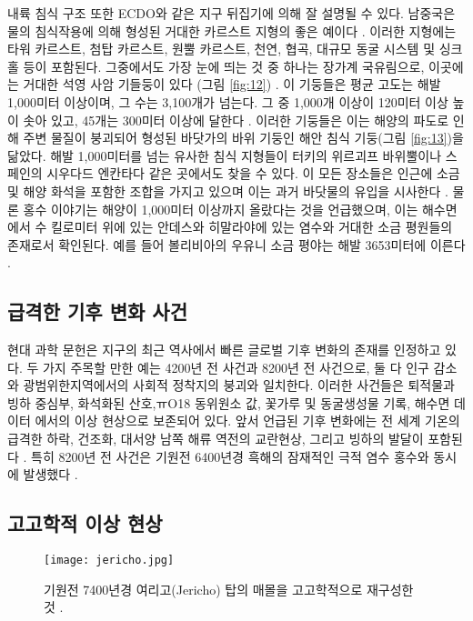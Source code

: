 \documentclass[10pt,twocolumn,letterpaper]{article}
\begin{document}
내륙 침식 구조 또한 ECDO와 같은 지구 뒤집기에 의해 잘 설명될 수 있다. 남중국은 물의 침식작용에 의해 형성된 거대한 카르스트 지형의 좋은 예이다 \cite{82}. 이러한 지형에는 타워 카르스트, 첨탑 카르스트, 원뿔 카르스트, 천연, 협곡, 대규모 동굴 시스템 및 싱크홀 등이 포함된다. 그중에서도 가장 눈에 띄는 것 중 하나는 장가계 국유림으로, 이곳에는 거대한 석영 사암 기들둥이 있다 (그림 \ref{fig:12}) \cite{84}. 이 기둥들은 평균 고도는 해발 1,000미터 이상이며, 그 수는 3,100개가 넘는다. 그 중 1,000개 이상이 120미터 이상 높이 솟아 있고, 45개는 300미터 이상에 달한다 \cite{85}. 이러한 기둥들은 이는 해양의 파도로 인해 주변 물질이 붕괴되어 형성된 바닷가의 바위 기둥인 해안 침식 기둥(그림 \ref{fig:13})을 닮았다. 해발 1,000미터를 넘는 유사한 침식 지형들이 터키의 위르괴프 바위뿔이나 스페인의 시우다드 엔칸타다 같은 곳에서도 찾을 수 있다. 이 모든 장소들은 인근에 소금 및 해양 화석을 포함한 조합을 가지고 있으며 이는 과거 바닷물의 유입을 시사한다 \cite{15,86,87}. 물론 홍수 이야기는 \cite{3} 해양이 1,000미터 이상까지 올랐다는 것을 언급했으며, 이는 해수면에서 수 킬로미터 위에 있는 안데스와 히말라야에 있는 염수와 거대한 소금 평원들의 존재로서 확인된다. 예를 들어 볼리비아의 우유니 소금 평야는 해발 3653미터에 이른다 \cite{94}.

\subsection{급격한 기후 변화 사건}

현대 과학 문헌은 지구의 최근 역사에서 빠른 글로벌 기후 변화의 존재를 인정하고 있다. 두 가지 주목할 만한 예는 4200년 전 사건과 8200년 전 사건으로, 둘 다 인구 감소와 광범위한지역에서의 사회적 정착지의 붕괴와 일치한다. 이러한 사건들은 퇴적물과 빙하 중심부, 화석화된 산호,ㅠO18 동위원소 값, 꽃가루 및 동굴생성물 기록, 해수면 데이터 에서의 이상 현상으로 보존되어 있다. 앞서 언급된 기후 변화에는 전 세계 기온의 급격한 하락, 건조화, 대서양 남쪽 해류 역전의 교란현상, 그리고 빙하의 발달이 포함된다 \cite{90,91,92}. 특히 8200년 전 사건은 기원전 6400년경 흑해의 잠재적인 극적 염수 홍수와 동시에 발생했다 \cite{93}.

\subsection{고고학적 이상 현상}

\begin{figure}[t]
\begin{center}
   \texttt{[image: jericho.jpg]}
\end{center}
   \caption{기원전 7400년경 여리고(Jericho) 탑의 매몰을 고고학적으로 재구성한 것 \cite{95}.}
\label{fig:14}
\label{fig:onecol}
\end{figure}
\end{document}
